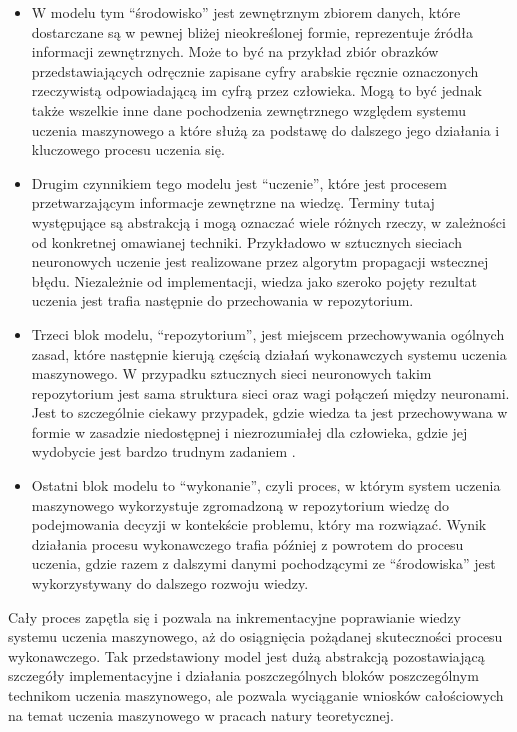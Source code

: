 \begin{itemize}

  \item W modelu tym ``środowisko'' jest zewnętrznym zbiorem danych, które dostarczane są w pewnej bliżej nieokreślonej formie, reprezentuje źródła informacji zewnętrznych.
        Może to być na przykład zbiór obrazków przedstawiających odręcznie zapisane cyfry arabskie ręcznie oznaczonych rzeczywistą odpowiadającą im cyfrą przez człowieka.
        Mogą to być jednak także wszelkie inne dane pochodzenia zewnętrznego względem systemu uczenia maszynowego a które służą za podstawę do dalszego jego działania i kluczowego procesu uczenia się.


  \item Drugim czynnikiem tego modelu jest ``uczenie'', które jest procesem przetwarzającym informacje zewnętrzne na wiedzę.
        Terminy tutaj występujące są abstrakcją i mogą oznaczać wiele różnych rzeczy, w zależności od konkretnej omawianej techniki.
        Przykładowo w sztucznych sieciach neuronowych uczenie jest realizowane przez algorytm propagacji wstecznej błędu.
        Niezależnie od implementacji, wiedza jako szeroko pojęty rezultat uczenia jest trafia następnie do przechowania w repozytorium.

  \item Trzeci blok modelu, ``repozytorium'', jest miejscem przechowywania ogólnych zasad, które następnie kierują częścią działań wykonawczych systemu uczenia maszynowego.
        W przypadku sztucznych sieci neuronowych takim repozytorium jest sama struktura sieci oraz wagi połączeń między neuronami.
        Jest to szczególnie ciekawy przypadek, gdzie wiedza ta jest przechowywana w formie w zasadzie niedostępnej i niezrozumiałej dla człowieka, gdzie jej wydobycie jest bardzo trudnym zadaniem \cite{boger1997knowledge}.

  \item Ostatni blok modelu to ``wykonanie'', czyli proces, w którym system uczenia maszynowego wykorzystuje zgromadzoną w repozytorium wiedzę do podejmowania decyzji w kontekście problemu, który ma rozwiązać.
        Wynik działania procesu wykonawczego trafia później z powrotem do procesu uczenia, gdzie razem z dalszymi danymi pochodzącymi ze ``środowiska'' jest wykorzystywany do dalszego rozwoju wiedzy.

\end{itemize}

Cały proces zapętla się i pozwala na inkrementacyjne poprawianie wiedzy systemu uczenia maszynowego, aż do osiągnięcia pożądanej skuteczności procesu wykonawczego.
Tak przedstawiony model jest dużą abstrakcją pozostawiającą szczegóły implementacyjne i działania poszczególnych bloków poszczególnym technikom uczenia maszynowego, ale pozwala wyciąganie wniosków całościowych na temat uczenia maszynowego w pracach natury teoretycznej.

